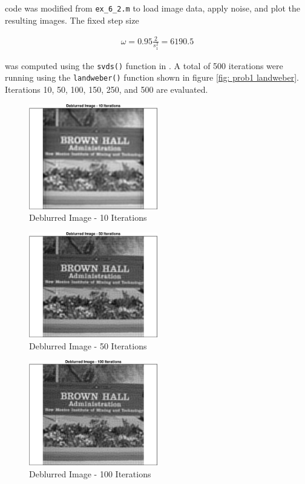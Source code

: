 \MATLAB code was modified from \verb|ex_6_2.m| to load image data, apply noise, and plot the resulting images. The fixed step size 

\begin{align*}
	\omega = 0.95 \frac{2}{s_1^2} = 6190.5
\end{align*}

was computed using the \verb|svds()| function in \MATLAB. A total of 500 iterations were running using the \verb|landweber()| function shown in figure \ref{fig: prob1 landweber}. Iterations 10, 50, 100, 150, 250, and 500 are evaluated. 

\begin{figure}[h] 
	\centering
	\includegraphics[width=0.5\textwidth]{./images/prob1_deblurred_image_10_iterations.eps}
	\caption{Deblurred Image - 10 Iterations}
	\label{fig: prob1 10 iterations}
\end{figure}
\FloatBarrier

\begin{figure}[h] 
	\centering
	\includegraphics[width=0.5\textwidth]{./images/prob1_deblurred_image_50_iterations.eps}
	\caption{Deblurred Image - 50 Iterations}
	\label{fig: prob1 50 iterations}
\end{figure}
\FloatBarrier

\begin{figure}[h] 
	\centering
	\includegraphics[width=0.5\textwidth]{./images/prob1_deblurred_image_100_iterations.eps}
	\caption{Deblurred Image - 100 Iterations}
	\label{fig: prob1 100 iterations}
\end{figure}
\FloatBarrier

